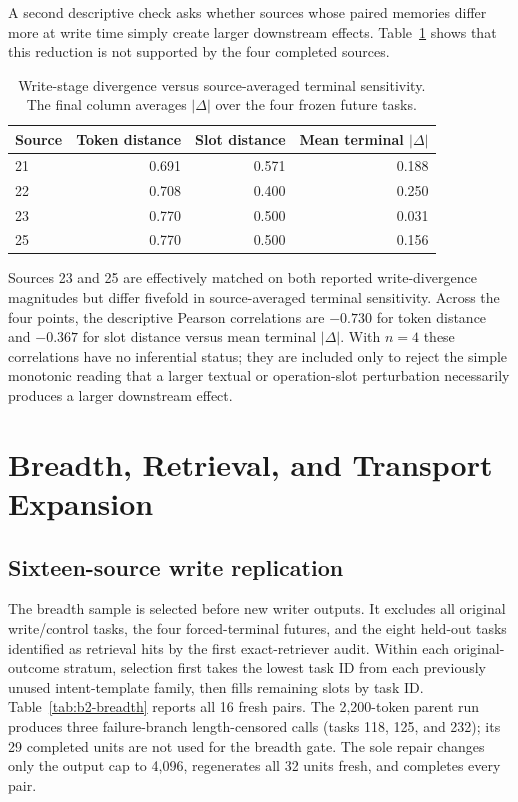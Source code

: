 A second descriptive check asks whether sources whose paired memories differ more at write time simply create larger downstream effects. Table~\ref{tab:write-terminal-magnitude} shows that this reduction is not supported by the four completed sources.
\begin{table}[h]
\centering
\small
\caption{Write-stage divergence versus source-averaged terminal sensitivity. The final column averages $|\Delta|$ over the four frozen future tasks.}
\label{tab:write-terminal-magnitude}
\begin{tabular}{lrrr}
\toprule
Source & Token distance & Slot distance & Mean terminal $|\Delta|$ \\
\midrule
21 & 0.691 & 0.571 & 0.188 \\
22 & 0.708 & 0.400 & 0.250 \\
23 & 0.770 & 0.500 & 0.031 \\
25 & 0.770 & 0.500 & 0.156 \\
\bottomrule
\end{tabular}
\end{table}
Sources 23 and 25 are effectively matched on both reported write-divergence magnitudes but differ fivefold in source-averaged terminal sensitivity. Across the four points, the descriptive Pearson correlations are $-0.730$ for token distance and $-0.367$ for slot distance versus mean terminal $|\Delta|$. With $n=4$ these correlations have no inferential status; they are included only to reject the simple monotonic reading that a larger textual or operation-slot perturbation necessarily produces a larger downstream effect.

\section{Breadth, Retrieval, and Transport Expansion}
\label{sec:breadth-transport-details}
\subsection{Sixteen-source write replication}
The breadth sample is selected before new writer outputs. It excludes all original write/control tasks, the four forced-terminal futures, and the eight held-out tasks identified as retrieval hits by the first exact-retriever audit. Within each original-outcome stratum, selection first takes the lowest task ID from each previously unused intent-template family, then fills remaining slots by task ID. Table~\ref{tab:b2-breadth} reports all 16 fresh pairs. The 2,200-token parent run produces three failure-branch length-censored calls (tasks 118, 125, and 232); its 29 completed units are not used for the breadth gate. The sole repair changes only the output cap to 4,096, regenerates all 32 units fresh, and completes every pair.

